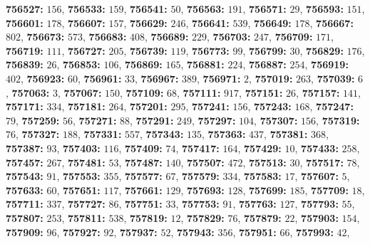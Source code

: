 \textsf{\bfseries 756527:} $156$, \textsf{\bfseries 756533:} $159$, \textsf{\bfseries 756541:} $50$, \textsf{\bfseries 756563:} $191$, \textsf{\bfseries 756571:} $29$, \textsf{\bfseries 756593:} $151$, \textsf{\bfseries 756601:} $178$, \textsf{\bfseries 756607:} $157$, \textsf{\bfseries 756629:} $246$, \textsf{\bfseries 756641:} $539$, \textsf{\bfseries 756649:} $178$, \textsf{\bfseries 756667:} $802$, \textsf{\bfseries 756673:} $573$, \textsf{\bfseries 756683:} $408$, \textsf{\bfseries 756689:} $229$, \textsf{\bfseries 756703:} $247$, \textsf{\bfseries 756709:} $171$, \textsf{\bfseries 756719:} $111$, \textsf{\bfseries 756727:} $205$, \textsf{\bfseries 756739:} $119$, \textsf{\bfseries 756773:} $99$, \textsf{\bfseries 756799:} $30$, \textsf{\bfseries 756829:} $176$, \textsf{\bfseries 756839:} $26$, \textsf{\bfseries 756853:} $106$, \textsf{\bfseries 756869:} $165$, \textsf{\bfseries 756881:} $224$, \textsf{\bfseries 756887:} $254$, \textsf{\bfseries 756919:} $402$, \textsf{\bfseries 756923:} $60$, \textsf{\bfseries 756961:} $33$, \textsf{\bfseries 756967:} $389$, \textsf{\bfseries 756971:} $2$, \textsf{\bfseries 757019:} $263$, \textsf{\bfseries 757039:} $6$, \textsf{\bfseries 757063:} $3$, \textsf{\bfseries 757067:} $150$, \textsf{\bfseries 757109:} $68$, \textsf{\bfseries 757111:} $917$, \textsf{\bfseries 757151:} $26$, \textsf{\bfseries 757157:} $141$, \textsf{\bfseries 757171:} $334$, \textsf{\bfseries 757181:} $264$, \textsf{\bfseries 757201:} $295$, \textsf{\bfseries 757241:} $156$, \textsf{\bfseries 757243:} $168$, \textsf{\bfseries 757247:} $79$, \textsf{\bfseries 757259:} $56$, \textsf{\bfseries 757271:} $88$, \textsf{\bfseries 757291:} $249$, \textsf{\bfseries 757297:} $104$, \textsf{\bfseries 757307:} $156$, \textsf{\bfseries 757319:} $76$, \textsf{\bfseries 757327:} $188$, \textsf{\bfseries 757331:} $557$, \textsf{\bfseries 757343:} $135$, \textsf{\bfseries 757363:} $437$, \textsf{\bfseries 757381:} $368$, \textsf{\bfseries 757387:} $93$, \textsf{\bfseries 757403:} $116$, \textsf{\bfseries 757409:} $74$, \textsf{\bfseries 757417:} $164$, \textsf{\bfseries 757429:} $10$, \textsf{\bfseries 757433:} $258$, \textsf{\bfseries 757457:} $267$, \textsf{\bfseries 757481:} $53$, \textsf{\bfseries 757487:} $140$, \textsf{\bfseries 757507:} $472$, \textsf{\bfseries 757513:} $30$, \textsf{\bfseries 757517:} $78$, \textsf{\bfseries 757543:} $91$, \textsf{\bfseries 757553:} $355$, \textsf{\bfseries 757577:} $67$, \textsf{\bfseries 757579:} $334$, \textsf{\bfseries 757583:} $17$, \textsf{\bfseries 757607:} $5$, \textsf{\bfseries 757633:} $60$, \textsf{\bfseries 757651:} $117$, \textsf{\bfseries 757661:} $129$, \textsf{\bfseries 757693:} $128$, \textsf{\bfseries 757699:} $185$, \textsf{\bfseries 757709:} $18$, \textsf{\bfseries 757711:} $337$, \textsf{\bfseries 757727:} $86$, \textsf{\bfseries 757751:} $33$, \textsf{\bfseries 757753:} $91$, \textsf{\bfseries 757763:} $127$, \textsf{\bfseries 757793:} $55$, \textsf{\bfseries 757807:} $253$, \textsf{\bfseries 757811:} $538$, \textsf{\bfseries 757819:} $12$, \textsf{\bfseries 757829:} $76$, \textsf{\bfseries 757879:} $22$, \textsf{\bfseries 757903:} $154$, \textsf{\bfseries 757909:} $96$, \textsf{\bfseries 757927:} $92$, \textsf{\bfseries 757937:} $52$, \textsf{\bfseries 757943:} $356$, \textsf{\bfseries 757951:} $66$, \textsf{\bfseries 757993:} $42$, 
